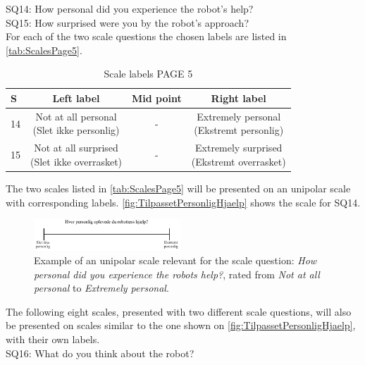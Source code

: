 \noindent
% 
SQ14: How personal did you experience the robot's help?\\%
SQ15: How surprised were you by the robot's approach?\\%
For each of the two scale questions the chosen labels are listed in \autoref{tab:ScalesPage5}. 
%
\begin{table}[H]
	\centering
\caption{Scale labels PAGE 5}
	\label{tab:ScalesPage5} 
	\begin{tabular}{l|c|c|c}
		S     & Left label & Mid point & Right label \\\hline
		14   & \makecell{Not at all personal\\(Slet ikke personlig)}  & - & \makecell{Extremely personal\\(Ekstremt personlig)}        \\\hline
		15   & \makecell{Not at all surprised\\(Slet ikke overrasket)} & - & \makecell{Extremely surprised \\(Ekstremt overrasket)}               
	\end{tabular}        
\end{table}
\noindent
%
The two scales listed in \autoref{tab:ScalesPage5} will be presented on an unipolar scale with corresponding labels. \autoref{fig:TilpassetPersonligHjaelp} shows the scale for SQ14. 
%
\begin{figure}[H]
\centering
\includegraphics[width = 0.49\textwidth]{Figure/TilpassetPersonligHjaelp}
\setlength{} 
\caption{Example of an unipolar scale relevant for the scale question: \textit{How personal did you experience the robots help?}, rated from \textit{Not at all personal} to \textit{Extremely personal}.}
\label{fig:TilpassetPersonligHjaelp}
\end{figure}
\noindent
% 
The following eight scales, presented with two different scale questions, will also be presented on scales similar to the one shown on \autoref{fig:TilpassetPersonligHjaelp}, with their own labels. \\  
SQ16: What do you think about the robot?\\%

